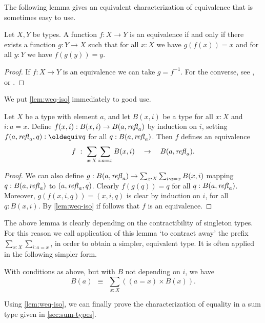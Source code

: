 The following lemma gives an equivalent characterization
of equivalence that is sometimes easy to use.

\begin{lemma}\label{lem:weq-iso}
Let $X,Y$ be types. A function $f: X\to Y$ is an equivalence
if and only if there exists a function $g: Y\to X$ such that
for all $x:X$ we have $g(f(x))=x$ and for all 
$y:Y$ we have $f(g(y))=y$.
\end{lemma}
\begin{proof}
If $f: X\to Y$ is an equivalence we can take $g=f^{-1}$.
For the converse, see
\cite[Chapter 4]{hottbook}, or .
\end{proof}

We put \cref{lem:weq-iso} immediately to good use.

\begin{lemma}\label{lem:contract-away}
Let $X$ be a type with element $a$, and let
$B(x,i)$ be a type for all $x:X$ and $i: a=x$.
Define $f(x,i): B(x,i) \to B(a,\mathop{{\it refl}_{a}})$ by induction on $i$,
setting $f(a,\refl{a},q) \defeq q$ for all $q:B(a,\mathop{{\it refl}_{a}})$.
Then $f$ defines an equivalence 
\[
f~:~ \sum_{x:X} \sum_{i: a=x} B(x,i) \quad \to \quad B(a,\mathop{{\it refl}_{a}}).
\]
\end{lemma}
\begin{proof}
We can also define 
$g: B(a,\mathop{{\it refl}_{a}})\to \sum_{x:X} \sum_{i: a=x} B(x,i)$
mapping $q: B(a,\mathop{{\it refl}_{a}})$ to $(a,\mathop{{\it refl}_{a}},q)$.
Clearly $f(g(q))=q$ for all $q:B(a,\mathop{{\it refl}_{a}})$.
Moreover, $g(f(x,i,q))=(x,i,q)$ is clear by induction
on $i$, for all $q:B(x,i)$.
By \cref{lem:weq-iso} if follows that $f$
is an equivalence.
\end{proof}

The above lemma is clearly depending on the 
contractibility of singleton types. For this reason
we call application of this lemma `to contract away'
the prefix $\sum_{x:X} \sum_{i: a=x}$, in order
to obtain a simpler, equivalent type. It is often applied
in the following simpler form.

\begin{corollary}\label{cor:contract-away}
With conditions as above, but with $B$ not depending on $i$, we have
\[
 B(a)~~\equiv~~\sum_{x:X} ((a=x)\times B(x)).
\]
\end{corollary}

Using \cref{lem:weq-iso}, we can finally prove the characterization of equality 
in a sum type given in \cref{sec:sum-types}.  

